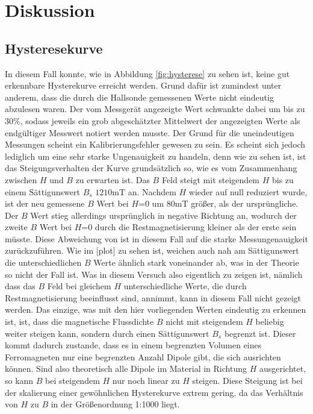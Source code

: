 \section{Diskussion}
\label{sec:Diskussion}

\subsection{Hysteresekurve}
    In diesem Fall konnte, wie in Abbildung \ref{fig:hysterese} zu 
    sehen ist, keine gut erkennbare Hysterekurve erreicht werden. 
    Grund dafür ist zumindest unter anderem, dass die durch die Hallsonde
    gemessenen Werte nicht eindeutig abzulesen waren. Der vom Messgerät angezeigte
    Wert schwankte dabei um bis zu 30\%, sodass jeweils ein grob abgeschätzter 
    Mittelwert der angezeigten Werte als endgültiger Messwert notiert werden musste.
    Der Grund für die uneindeutigen Messungen scheint ein Kalibrierungsfehler gewesen zu sein.
    Es scheint sich jedoch lediglich um eine sehr starke Ungenauigkeit zu handeln, denn wie 
    zu sehen ist, ist das Steigungsverhalten der Kurve grundsätzlich so, wie es vom Zusammenhang 
    zwischen $H$ und $B$ zu erwarten ist. Das $B$ Feld steigt mit steigendem $H$
    bis zu einem Sättigunswert $B_s$ \approx $1210\si{\milli\tesla}$ an. Nachdem $H$ wieder
    auf null reduziert wurde, ist der neu gemessene $B$ Wert bei $H$=0 um 80\si{\milli\tesla} 
    größer, als der ursprüngliche. Der $B$ Wert stieg allerdings ursprünglich in negative Richtung an,
    wodurch der zweite $B$ Wert bei $H$=0 durch die Restmagnetisierung kleiner als der erste sein müsste.
    Diese Abweichung von ist in diesem Fall auf die starke Messungenauigkeit zurückzuführen. Wie im [plot] zu sehen ist,
    weichen auch nah am Sättigunswert die unterschiedlichen $B$ Werte ähnlich stark voneinander ab, was in der Theorie
    so nicht der Fall ist. Was in diesem Versuch also eigentlich zu zeigen ist, nämlich dass das $B$ Feld bei gleichem
    $H$ unterschiedliche Werte, die durch Restmagnetisierung beeinflusst sind, annimmt, kann in diesem Fall nicht gezeigt
    werden. Das einzige, was mit den hier vorliegenden Werten eindeutig zu erkennen ist, ist, dass die magnetische 
    Flussdichte $B$ nicht mit steigendem $H$ beliebig weiter steigen kann, sondern durch einen Sättigunswert $B_s$
    begrenzt ist. Dieser kommt dadurch zustande, dass es in einem begrenzten Volumen eines Ferromagneten nur eine begrenzten
    Anzahl Dipole gibt, die sich ausrichten können. Sind also theoretisch alle Dipole im Material in Richtung $H$
    ausgerichtet, so kann $B$ bei steigendem $H$ nur noch linear zu $H$ steigen. Diese Steigung ist
    bei der skalierung einer gewöhnlichen Hysterekurve extrem gering, da das Verhältnis von $H$ zu $B$ in der 
    Größenordnung 1:1000 liegt. %
